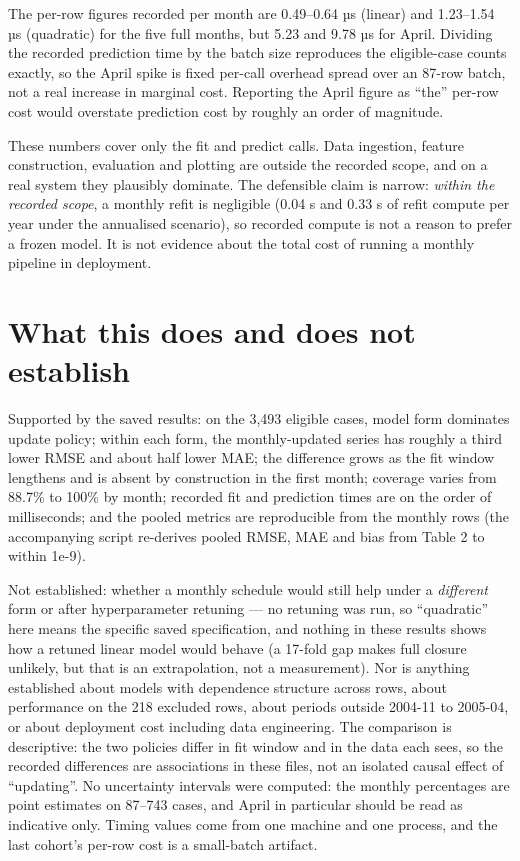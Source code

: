 The per-row figures recorded per month are 0.49--0.64 µs (linear) and
1.23--1.54 µs (quadratic) for the five full months, but 5.23 and 9.78 µs
for April. Dividing the recorded prediction time by the batch size
reproduces the eligible-case counts exactly, so the April spike is fixed
per-call overhead spread over an 87-row batch, not a real increase in
marginal cost. Reporting the April figure as ``the'' per-row cost would
overstate prediction cost by roughly an order of magnitude.

These numbers cover only the fit and predict calls. Data ingestion,
feature construction, evaluation and plotting are outside the recorded
scope, and on a real system they plausibly dominate. The defensible
claim is narrow: \emph{within the recorded scope}, a monthly refit is
negligible (0.04 s and 0.33 s of refit compute per year under the
annualised scenario), so recorded compute is not a reason to prefer a
frozen model. It is not evidence about the total cost of running a
monthly pipeline in deployment.

\hypertarget{what-this-does-and-does-not-establish}{%
\section{What this does and does not
establish}\label{what-this-does-and-does-not-establish}}

Supported by the saved results: on the 3,493 eligible cases, model form
dominates update policy; within each form, the monthly-updated series
has roughly a third lower RMSE and about half lower MAE; the difference
grows as the fit window lengthens and is absent by construction in the
first month; coverage varies from 88.7\% to 100\% by month; recorded fit
and prediction times are on the order of milliseconds; and the pooled
metrics are reproducible from the monthly rows (the accompanying script
re-derives pooled RMSE, MAE and bias from Table 2 to within 1e-9).

Not established: whether a monthly schedule would still help under a
\emph{different} form or after hyperparameter retuning --- no retuning
was run, so ``quadratic'' here means the specific saved specification,
and nothing in these results shows how a retuned linear model would
behave (a 17-fold gap makes full closure unlikely, but that is an
extrapolation, not a measurement). Nor is anything established about
models with dependence structure across rows, about performance on the
218 excluded rows, about periods outside 2004-11 to 2005-04, or about
deployment cost including data engineering. The comparison is
descriptive: the two policies differ in fit window and in the data each
sees, so the recorded differences are associations in these files, not
an isolated causal effect of ``updating''. No uncertainty intervals were
computed: the monthly percentages are point estimates on 87--743 cases,
and April in particular should be read as indicative only. Timing values
come from one machine and one process, and the last cohort's per-row
cost is a small-batch artifact.

